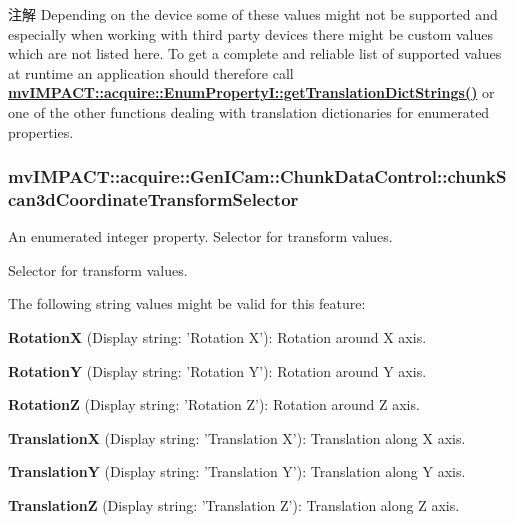 \begin{DoxyNote}{注解}
Depending on the device some of these values might not be supported and especially when working with third party devices there might be custom values which are not listed here. To get a complete and reliable list of supported values at runtime an application should therefore call {\bfseries \hyperlink{classmv_i_m_p_a_c_t_1_1acquire_1_1_enum_property_i_a0ba6ccbf5ee69784d5d0b537924d26b6}{mv\+I\+M\+P\+A\+C\+T\+::acquire\+::\+Enum\+Property\+I\+::get\+Translation\+Dict\+Strings()}} or one of the other functions dealing with translation dictionaries for enumerated properties. 
\end{DoxyNote}
\hypertarget{classmv_i_m_p_a_c_t_1_1acquire_1_1_gen_i_cam_1_1_chunk_data_control_a8ab0a44c2daae75c839b3974a1c1cb6b}{
\subsubsection[{chunk\+Scan3d\+Coordinate\+Transform\+Selector}]{ mv\+I\+M\+P\+A\+C\+T\+::acquire\+::\+Gen\+I\+Cam\+::\+Chunk\+Data\+Control\+::chunk\+Scan3d\+Coordinate\+Transform\+Selector}}\label{classmv_i_m_p_a_c_t_1_1acquire_1_1_gen_i_cam_1_1_chunk_data_control_a8ab0a44c2daae75c839b3974a1c1cb6b}


An enumerated integer property. Selector for transform values. 

Selector for transform values.

The following string values might be valid for this feature\+:
\begin{DoxyItemize}
\item {\bfseries Rotation\+X} (Display string\+: 'Rotation X')\+: Rotation around X axis.
\item {\bfseries Rotation\+Y} (Display string\+: 'Rotation Y')\+: Rotation around Y axis.
\item {\bfseries Rotation\+Z} (Display string\+: 'Rotation Z')\+: Rotation around Z axis.
\item {\bfseries Translation\+X} (Display string\+: 'Translation X')\+: Translation along X axis.
\item {\bfseries Translation\+Y} (Display string\+: 'Translation Y')\+: Translation along Y axis.
\item {\bfseries Translation\+Z} (Display string\+: 'Translation Z')\+: Translation along Z axis.
\end{DoxyItemize}

